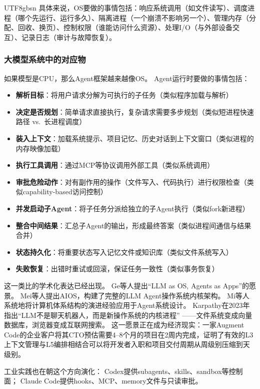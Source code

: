 \documentclass[11pt,a4paper]{article}
\begin{document}
\begin{CJK*}{UTF8}{gbsn}
具体来说，OS要做的事情包括：响应系统调用（如文件读写）、调度进程（哪个先运行、运行多久）、隔离进程（一个崩溃不影响另一个）、管理内存（分配、回收、换页）、控制权限（谁能访问什么资源）、处理I/O（与外部设备交互）、记录日志（审计与故障恢复）。

\subsubsection{大模型系统中的对应物}

如果模型是CPU，那么Agent框架越来越像OS。
Agent运行时要做的事情包括：
\begin{itemize}[nosep]
\item \textbf{解析目标}：将用户请求分解为可执行的子任务（类似程序加载与解析）
\item \textbf{决定是否规划}：简单请求直接执行，复杂请求需要多步规划（类似短进程快速路径 vs.\ 长进程调度）
\item \textbf{装入上下文}：加载系统提示、项目记忆、历史对话到上下文窗口（类似进程的内存映像加载）
\item \textbf{执行工具调用}：通过MCP等协议调用外部工具（类似系统调用）
\item \textbf{审批危险动作}：对有副作用的操作（文件写入、代码执行）进行权限检查（类似capability-based访问控制）
\item \textbf{并发启动子Agent}：将子任务分派给独立的子Agent执行（类似fork新进程）
\item \textbf{整合中间结果}：汇总子Agent的输出，形成最终答案（类似进程间通信与结果合并）
\item \textbf{状态持久化}：将重要状态写入记忆文件或知识库（类似文件系统写入）
\item \textbf{失败恢复}：出错时重试或回滚，保证任务一致性（类似事务恢复）
\end{itemize}

这一类比的学术化表达已经出现。
Ge等人提出``LLM as OS, Agents as Apps''的愿景\cite{ge2023llmos}。
Mei等人提出AIOS，构建了完整的LLM Agent操作系统内核架构\cite{mei2024aios}。
Mi等人系统地将计算机体系结构的演进经验应用于Agent系统设计\cite{mi2025llmagentscomputersystems}。
Karpathy在2023年指出``LLM不是聊天机器人，而是新操作系统的内核进程''%
\cite{karpathy2023llmos}——文件系统变成向量数据库，浏览器变成互联网搜索。
这一愿景正在成为经济现实：一家Augment Code的企业客户将其CTO预估需要4--8个月的项目在2周内完成\cite{anthropic2026agenticreport}，证明了有效的L3上下文管理与L5编排相结合可以将开发者入职和项目交付周期从周级别压缩到天级别。

工业实践也在朝这个方向演化：
Codex提供subagents、skills、sandbox等控制面\cite{openai_codex_overview_2026}；
Claude Code提供hooks、MCP、memory文件与只读审批\cite{anthropic_claudecode_overview_2026}。


\end{CJK*}
\end{document}
